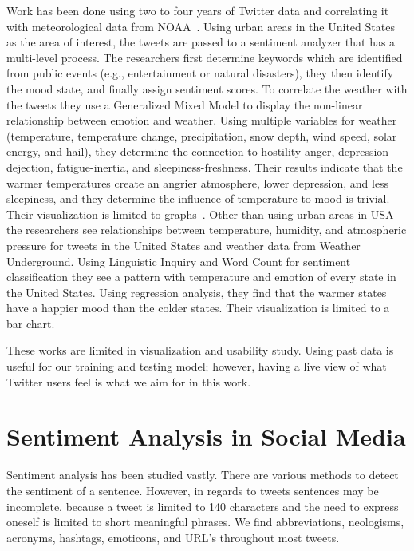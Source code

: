 Work has been done using two to four years of Twitter data and correlating it with meteorological data from NOAA~\cite{hannak2012tweetin,keller2005warm}. Using urban areas in the United States as the area of interest, the tweets are passed to a sentiment analyzer that has a multi-level process. The researchers first determine keywords which are identified from public events (e.g., entertainment or natural disasters), they then identify the mood state, and finally assign sentiment scores. To correlate the weather with the tweets they use a Generalized Mixed Model to display the non-linear relationship between emotion and weather. Using multiple variables for weather (temperature, temperature change, precipitation, snow depth, wind speed, solar energy, and hail), they determine the connection to hostility-anger, depression-dejection, fatigue-inertia, and sleepiness-freshness. Their results indicate that the warmer temperatures create an angrier atmosphere, lower depression, and less sleepiness, and they determine the influence of temperature to mood is trivial. Their visualization is limited to graphs~\cite{hannak2012tweetin}. Other than using urban areas in USA the researchers see relationships between temperature, humidity, and atmospheric pressure for tweets in the United States and weather data from Weather Underground. Using Linguistic Inquiry and Word Count for sentiment classification they see a pattern with temperature and emotion of every state in the United States. Using regression analysis, they find that the warmer states have a happier mood than the colder states. Their visualization is limited to a bar chart.

These works are limited in visualization and usability study. Using past data is useful for our training and testing model; however, having a live view of what Twitter users feel is what we aim for in this work.


\section{Sentiment Analysis in Social Media}

Sentiment analysis has been studied vastly. There are various methods to detect the sentiment of a sentence. However, in regards to tweets sentences may be incomplete, because a tweet is limited to 140 characters and the need to express oneself is limited to short meaningful phrases. We find abbreviations, neologisms, acronyms, hashtags, emoticons, and URL's throughout most tweets.


